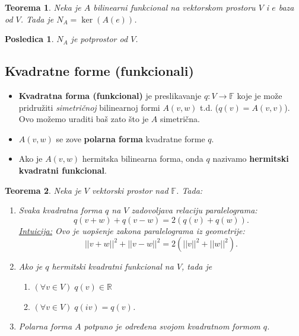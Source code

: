 \documentclass[a4paper,12pt,twoside]{report}
\newtheorem{theorem}{Teorema}[section]
\newtheorem{corollary}{Posledica}[theorem]
\numberwithin{algorithm}{section}
\begin{document}
\begin{theorem}
    Neka je $A$ bilinearni funkcional na vektorskom prostoru $V$ i $e$ baza od $V$. Tada je $N_A = \ker (A(e))$.
\end{theorem}

\begin{corollary}
    $N_A$ je potprostor od $V$.
\end{corollary}

\subsection{Kvadratne forme (funkcionali)}

\begin{itemize}
    \item \textbf{Kvadratna forma (funkcional)} je preslikavanje $q: V \to \mathbb{F}$ koje je može pridružiti \textit{simetričnoj}
    bilinearnoj formi $A(v, w)$ t.d. ($q(v) = A(v, v)$). Ovo možemo uraditi baš zato što je $A$ simetrična.
    \item $A(v, w)$ se zove \textbf{polarna forma} kvadratne forme $q$.
    \item Ako je $A(v, w)$ hermitska bilinearna forma, onda $q$ nazivamo \textbf{hermitski kvadratni funkcional}.
\end{itemize}

\begin{theorem}
    Neka je $V$ vektorski prostor nad $\mathbb{F}$. Tada:
    \begin{enumerate}
        \item Svaka kvadratna forma $q$ na $V$ zadovoljava \textit{relaciju paralelograma}:
        \[ q(v + w) + q(v-w) = 2(q(v) + q(w)). \]
        \noindent\underline{\textit{Intuicija:}} Ovo je uopšenje zakona paralelograma iz geometrije:
        \[ ||v + w||^2 + ||v - w||^2 = 2(||v||^2 + ||w||^2). \] 
        \item Ako je $q$ hermitski kvadratni funkcional na $V$, tada je
        \begin{enumerate}
            \item $(\forall v \in V) \; q(v) \in \mathbb{R}$
            \item $(\forall v \in V) \; q(iv) = q(v)$.
        \end{enumerate}
        \item Polarna forma $A$ potpuno je određena svojom kvadratnom formom $q$.
    \end{enumerate}
\end{theorem}\
\end{document}
